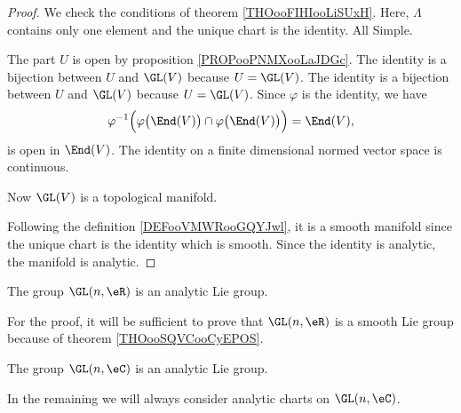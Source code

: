 \begin{proof}
	We check the conditions of theorem \ref{THOooFIHIooLiSUxH}. Here, \( \Lambda\) contains only one element and the unique chart is the identity. All Simple.

	\begin{subproof}
		The part \( U\) is open by proposition \ref{PROPooPNMXooLaJDGc}.
		The identity is a bijection between \( U\) and \( \GL(V)\) because \( U=\GL(V)\).
		The identity is a bijection between \( U\) and \( \GL(V)\) because \( U=\GL(V)\).
		Since \( \varphi\) is the identity, we have
		\begin{equation}
			\varphi^{-1}\Big(   \varphi\big( \End(V) \big)\cap\varphi\big( \End(V) \big)   \Big)=\End(V),
		\end{equation}
		is open in \( \End(V)\).
		The identity on a finite dimensional normed vector space is continuous.
	\end{subproof}
	Now \( \GL(V)\) is a topological manifold.

	Following the definition \ref{DEFooVMWRooGQYJwl}, it is a smooth manifold since the unique chart is the identity which is smooth. Since the identity is analytic, the manifold is analytic.
\end{proof}


\begin{proposition}		\label{PROPooPZABooXxQkFi}
	The group \( \GL(n,\eR)\) is an analytic Lie group.
\end{proposition}
\noproof
For the proof, it will be sufficient to prove that \( \GL(n,\eR)\) is a smooth Lie group because of theorem \ref{THOooSQVCooCyEPOS}.

\begin{proposition}     \label{PROPooWRVKooLfqLfV}
	The group \( \GL(n,\eC)\) is an analytic Lie group.
\end{proposition}
\noproof


In the remaining we will always consider analytic charts on \( \GL(n,\eC)\).

